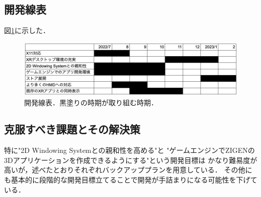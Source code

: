 \subsection{開発線表}

図\ref{fig:schedule}に示した．

\begin{figure}[htbp]
  \centering
  \includegraphics[keepaspectratio, width=\linewidth]{fig/schedule.png}
  \caption{開発線表．黒塗りの時期が取り組む時期．}
  \label{fig:schedule}
\end{figure}

\subsection{克服すべき課題とその解決策}

特に"2D Windowing Systemとの親和性を高める"と
"ゲームエンジンでZIGENの3Dアプリケーションを作成できるようにする"という開発目標は
かなり難易度が高いが，述べたとおりそれぞれバックアッププランを用意している．
その他にも基本的に段階的な開発目標立てることで開発が手詰まりになる可能性を下げている．

